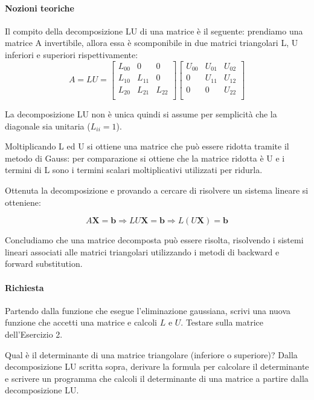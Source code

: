 \paragraph{Nozioni teoriche}

Il compito della decomposizione LU di una matrice è il seguente: prendiamo
una matrice A invertibile, allora essa è scomponibile in due matrici triangolari
L, U inferiori e superiori rispettivamente:
$$
	A = LU = \begin{bmatrix}
		L_{00} & 0      & 0      \\
		L_{10} & L_{11} & 0      \\
		L_{20} & L_{21} & L_{22} \\
	\end{bmatrix}
	\begin{bmatrix}
		U_{00} & U_{01} & U_{02} \\
		0      & U_{11} & U_{12} \\
		0      & 0      & U_{22} \\
	\end{bmatrix}
$$

La decomposizione LU non è unica quindi si assume per semplicità che la diagonale
sia unitaria ($L_{ii} = 1$).

Moltiplicando L ed U si ottiene una matrice che può essere ridotta tramite il metodo
di Gauss: per comparazione si ottiene che la matrice ridotta è U e i termini di L sono
i termini scalari moltiplicativi utilizzati per ridurla.

Ottenuta la decomposizione e provando a cercare di risolvere un sistema lineare si otteniene:

$$
	A \mathbf{X} = \mathbf{b} \Rightarrow LU \mathbf{X} = \mathbf{b} \Rightarrow L(U \mathbf{X}) = \mathbf{b}
$$

Concludiamo che una matrice decomposta può essere risolta, risolvendo i sistemi
lineari associati alle matrici triangolari utilizzando i metodi di backward e
forward substitution.

\paragraph{Richiesta}

Partendo dalla funzione che esegue l'eliminazione gaussiana, scrivi una nuova 
funzione che accetti una matrice e calcoli \( L \) e \( U \). Testare sulla 
matrice dell'Esercizio 2.

Qual è il determinante di una matrice triangolare (inferiore o superiore)? Dalla 
decomposizione LU scritta sopra, derivare la formula per calcolare il determinante 
e scrivere un programma che calcoli il determinante di una matrice a partire dalla 
decomposizione LU.

